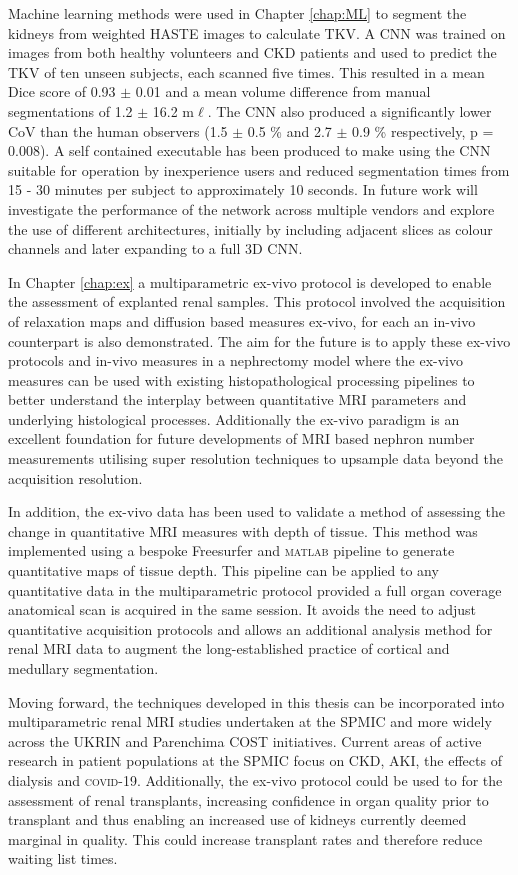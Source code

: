 Machine learning methods were used in Chapter \ref{chap:ML} to segment the kidneys from \ttwo weighted \ac{HASTE} images to calculate \ac{TKV}. A \ac{CNN} was trained on images from both healthy volunteers and \ac{CKD} patients and used to predict the \ac{TKV} of ten unseen subjects, each scanned five times. This resulted in a mean Dice score of 0.93 $\pm$ 0.01 and a mean volume difference from manual segmentations of 1.2 $\pm$ 16.2 m$\ell$. The \ac{CNN} also produced a significantly lower \ac{CoV} than the human observers (1.5 $\pm$ 0.5 \% and 2.7 $\pm$ 0.9 \% respectively, p = 0.008). A self contained executable has been produced to make using the \ac{CNN} suitable for operation by inexperience users and reduced segmentation times from 15 - 30 minutes per subject to approximately 10 seconds. In future work will investigate the performance of the network across multiple vendors and explore the use of different architectures, initially by including adjacent slices as colour channels and later expanding to a full 3D \ac{CNN}. 

In Chapter \ref{chap:ex} a multiparametric ex-vivo protocol is developed to enable the assessment of explanted renal samples. This protocol involved the acquisition of relaxation maps and diffusion based measures ex-vivo, for each an in-vivo counterpart is also demonstrated. The aim for the future is to apply these ex-vivo protocols and in-vivo measures in a nephrectomy model where the ex-vivo measures can be used with existing histopathological processing pipelines to better understand the interplay between quantitative \ac{MRI} parameters and underlying histological processes. Additionally the ex-vivo paradigm is an excellent foundation for future developments of \ac{MRI} based nephron number measurements utilising super resolution techniques to upsample data beyond the acquisition resolution.

In addition, the ex-vivo data has been used to validate a method of assessing the change in quantitative \ac{MRI} measures with depth of tissue. This method was implemented using a bespoke Freesurfer and \textsc{matlab} pipeline to generate quantitative maps of tissue depth. This pipeline can be applied to any quantitative data in the multiparametric protocol provided a full organ coverage anatomical scan is acquired in the same session. It avoids the need to adjust quantitative acquisition protocols and allows an additional analysis method for renal \ac{MRI} data to augment the long-established practice of cortical and medullary segmentation.

Moving forward, the techniques developed in this thesis can be incorporated into multiparametric renal \ac{MRI} studies undertaken at the \ac{SPMIC} and more widely across the \ac{UKRIN} and Parenchima \ac{COST} initiatives. Current areas of active research in patient populations at the \ac{SPMIC} focus on \ac{CKD}, \ac{AKI}, the effects of dialysis and \textsc{covid}-19. Additionally, the ex-vivo protocol could be used to for the assessment of renal transplants, increasing confidence in organ quality prior to transplant and thus enabling an increased use of kidneys currently deemed marginal in quality. This could increase transplant rates and therefore reduce waiting list times. 